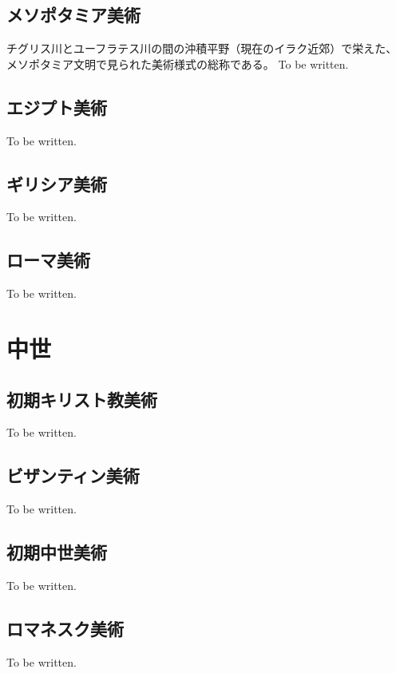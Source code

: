 \documentclass[letterpaper,10pt,dvipdfmx]{sphinxmanual}
\begin{document}
\subsection{メソポタミア美術}
\label{\detokenize{category:id4}}
チグリス川とユーフラテス川の間の沖積平野（現在のイラク近郊）で栄えた、
メソポタミア文明で見られた美術様式の総称である。
To be written.


\subsection{エジプト美術}
\label{\detokenize{category:id5}}
To be written.


\subsection{ギリシア美術}
\label{\detokenize{category:id6}}
To be written.


\subsection{ローマ美術}
\label{\detokenize{category:id7}}
To be written.


\section{中世}
\label{\detokenize{category:id8}}

\subsection{初期キリスト教美術}
\label{\detokenize{category:id9}}
To be written.


\subsection{ビザンティン美術}
\label{\detokenize{category:id10}}
To be written.


\subsection{初期中世美術}
\label{\detokenize{category:id11}}
To be written.


\subsection{ロマネスク美術}
\label{\detokenize{category:id12}}
To be written.
\end{document}
